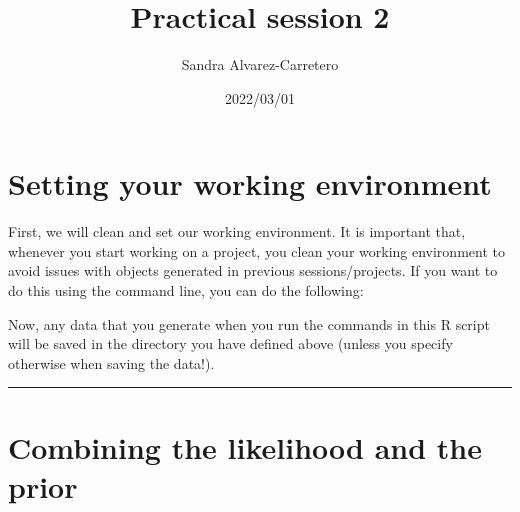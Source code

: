\documentclass[
]{article}
\title{Practical session 2}
\author{Sandra Alvarez-Carretero}
\date{2022/03/01}
\newenvironment{Shaded}{\begin{snugshade}}{\end{snugshade}}
\newcommand{\AttributeTok}[1]{\textcolor[rgb]{0.77,0.63,0.00}{#1}}
\newcommand{\CommentTok}[1]{\textcolor[rgb]{0.56,0.35,0.01}{\textit{#1}}}
\newcommand{\FunctionTok}[1]{\textcolor[rgb]{0.00,0.00,0.00}{#1}}
\newcommand{\NormalTok}[1]{#1}
\newcommand{\OtherTok}[1]{\textcolor[rgb]{0.56,0.35,0.01}{#1}}
\newcommand{\SpecialCharTok}[1]{\textcolor[rgb]{0.00,0.00,0.00}{#1}}
\newcommand{\StringTok}[1]{\textcolor[rgb]{0.31,0.60,0.02}{#1}}
\begin{document}
\maketitle

\hypertarget{setting-your-working-environment}{%
\section{Setting your working
environment}\label{setting-your-working-environment}}

First, we will clean and set our working environment. It is important
that, whenever you start working on a project, you clean your working
environment to avoid issues with objects generated in previous
sessions/projects. If you want to do this using the command line, you
can do the following:

\begin{Shaded}
\end{Shaded}

Now, any data that you generate when you run the commands in this R
script will be saved in the directory you have defined above (unless you
specify otherwise when saving the data!).

\begin{center}\rule{0.5\linewidth}{0.5pt}\end{center}

\hypertarget{combining-the-likelihood-and-the-prior}{%
\section{Combining the likelihood and the
prior}\label{combining-the-likelihood-and-the-prior}}
\end{document}
